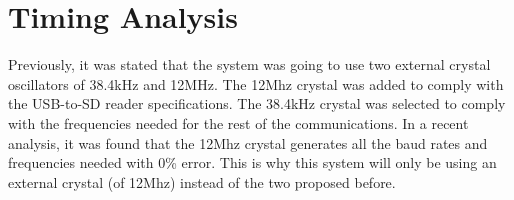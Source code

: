 \section{Timing Analysis}

Previously, it was stated that the system was going to use two external crystal oscillators of 38.4kHz and 12MHz. The 12Mhz crystal was added to comply with the USB-to-SD reader specifications.  The 38.4kHz crystal was selected to comply with the frequencies needed for the rest of the communications. In a recent analysis, it was found that the 12Mhz crystal generates all the baud rates and frequencies needed with 0\% error. This is why this system will only be using an external crystal (of 12Mhz) instead of the two proposed before.   

